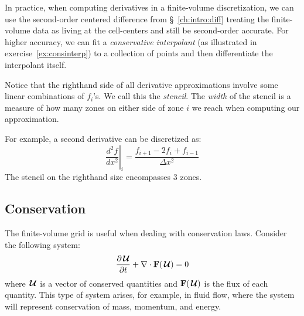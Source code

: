 In practice, when computing derivatives in a finite-volume
discretization, we can use the second-order centered difference from
\S~\ref{ch:intro:diff} treating the finite-volume data as living at the
cell-centers and still be second-order accurate.  For higher accuracy,
we can fit a {\em conservative interpolant} (as illustrated in
exercise~\ref{ex:consinterp}) to a collection of points and then
differentiate the interpolant itself.  

Notice that the righthand side of all derivative approximations involve
some linear combinations of $f_i$'s.  We call this the {\em stencil}.
The {\em width} of the stencil is a measure of how many zones on
either side of zone $i$ we reach when computing our approximation.

For example, a second derivative can be discretized as:
\begin{equation}
\left . \frac{d^2 f}{dx^2} \right |_i = \frac{f_{i+1} - 2 f_i + f_{i-1}}{\Delta x^2}
\end{equation}
The stencil on the righthand size encompasses 3 zones.

\subsection{Conservation}

The finite-volume grid is useful when dealing with conservation laws.
Consider the following system:
\begin{equation}
\frac{\partial {\,\boldsymbol{\mathcal{U}}}}{\partial t} + \nabla \cdot {\bf F}({\,\boldsymbol{\mathcal{U}}}) = 0
\end{equation}
where ${\,\boldsymbol{\mathcal{U}}}$ is a vector of conserved quantities and ${\bf F}({\,\boldsymbol{\mathcal{U}}})$ is the flux
of each quantity.  This type of system arises, for example, in fluid
flow, where the system will represent conservation of mass, momentum,
and energy.

